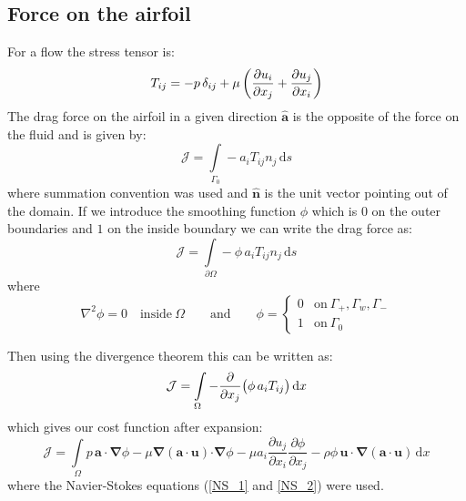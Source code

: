 \documentclass[12pt, a4paper]{article}
\begin{document}
    \subsection{Force on the airfoil}
    For a flow the stress tensor is:
    \begin{equation} \label{stress_tensor}
    T_{ij} = -p \, \delta_{ij} +
    \mu \, \bigg{(}\frac{\partial u_i}{\partial x_j} + \frac{\partial u_j}{\partial x_i} \bigg{)}
    \end{equation}
    The drag force on the airfoil in a given direction $\mathbf{\hat{a}}$ is the opposite of the force on the fluid and is given by:
    \begin{equation} \label{direct_force}
    \mathcal{J} = \int\limits_{\Gamma_0} -a_i T_{ij} n_j \, \mathrm{d}s
    \end{equation}
    where summation convention was used and $\mathbf{\hat{n}}$ is the unit vector pointing out of the domain. If we introduce the smoothing function $\phi$ which is $0$ on the outer boundaries and $1$ on the inside boundary we can write the drag force as:
    \begin{equation} \label{direct_force_phi}
    \mathcal{J} = \int\limits_{\partial \Omega} - \phi \, a_i T_{ij} n_j \, \mathrm{d}s
    \end{equation}
    where
    \begin{equation} \label{phi_definition}
    \nabla^2 \phi = 0 \quad \text{inside}\ \Omega
    \qquad \text{and} \qquad
    \phi = \begin{cases}
    0	 &	\text{on}\ \Gamma_+, \Gamma_w, \Gamma_- \\
    1	 &	\text{on}\ \Gamma_0
    \end{cases}
    \end{equation}
    
    Then using the divergence theorem this can be written as:
    \begin{equation} \label{force_divergence}
    \mathcal{J} = \int\limits_{\Omega} - \frac{\partial}{\partial x_j}\big{(}\phi \, a_i T_{ij} \big{)} \, \mathrm{d}x
    \end{equation}
    which gives our cost function after expansion:
    \begin{equation} \label{cost_function}
    \mathcal{J} = \int\limits_{\Omega}{{p\, \mathbf{a \cdot} \boldsymbol{\nabla} \phi} -
        {\mu \boldsymbol{\nabla}(\mathbf{a \cdot u}) \mathbf{\cdot} \boldsymbol{\nabla} \phi} - 
        {\mu a_i \frac{\partial u_j}{\partial x_i} \frac{\partial \phi}{\partial x_j}} - 
        {\rho \phi \, \mathbf{u \cdot} \boldsymbol{\nabla}(\mathbf{a \cdot u})}
        \,  \mathrm{d}x}
    \end{equation}
    where the Navier-Stokes equations (\ref{NS_1} and \ref{NS_2}) were used.
    
\end{document}

